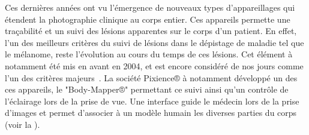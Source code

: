 Ces dernières années ont vu l'émergence de nouveaux types d'appareillages qui étendent la photographie clinique au corps entier. Ces appareils permette une traçabilité et un suivi des lésions apparentes sur le corps d'un patient. En effet, l'un des meilleurs critères du suivi de lésions dans le dépistage de maladie tel que le mélanome, reste l'évolution au cours du temps de ces lésions. Cet élément à notamment été mis en avant en 2004, et est encore considéré de nos jours comme l'un des critères majeurs~\cite{Abbasi2004,Glazer2017}. La société Pixience® à notamment développé un des ces appareils, le "Body-Mapper®" permettant ce suivi ainsi qu'un contrôle de l'éclairage lors de la prise de vue. Une interface guide le médecin lors de la prise d'images et permet d'associer à un modèle humain les diverses parties du corps (voir la ).\par

